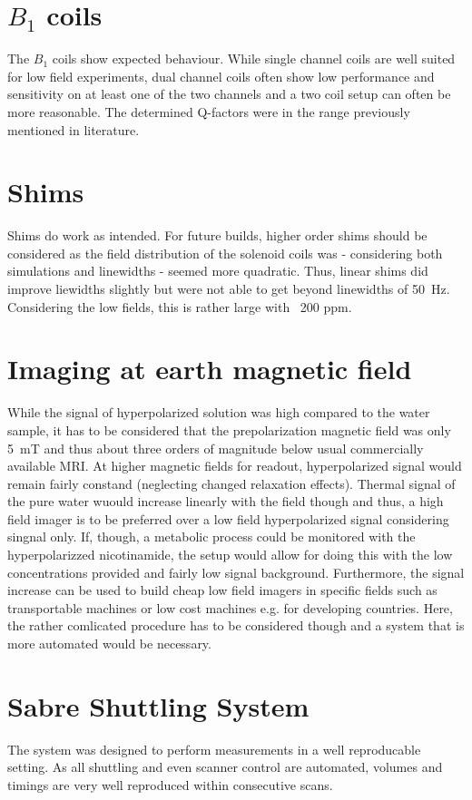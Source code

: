     \section{$B_1$ coils}
        The $B_1$ coils show expected behaviour. While single channel coils are well suited for low field experiments, dual channel coils often show low performance and sensitivity on at least one of the two channels and a two coil setup can often be more reasonable. The determined Q-factors were in the range previously mentioned in literature. 
    \section{Shims}
        Shims do work as intended. For future builds, higher order shims should be considered as the field distribution of the solenoid coils was - considering both simulations and linewidths - seemed more quadratic. Thus, linear shims did improve liewidths slightly but were not able to get beyond linewidths of \SI{50}{\hertz}. Considering the low fields, this is rather large with ~200 ppm.
    \section{Imaging at earth magnetic field}
        While the signal of hyperpolarized solution was high compared to the water sample, it has to be considered that the prepolarization magnetic field was only \SI{5}{\milli\tesla} and thus about three orders of magnitude below usual commercially available MRI. At higher magnetic fields for readout, hyperpolarized signal would remain fairly constand (neglecting changed relaxation effects). Thermal signal of the pure water wuould increase linearly with the field though and thus, a high field imager is to be preferred over a low field hyperpolarized signal considering singnal only. If, though, a metabolic process could be monitored with the hyperpolarizzed nicotinamide, the setup would allow for doing this with the low concentrations provided and fairly low signal background. Furthermore, the signal increase can be used to build cheap low field imagers in specific fields such as transportable machines or low cost machines e.g. for developing countries. Here, the rather comlicated procedure has to be considered though and a system that is more automated would be necessary.
    \section{Sabre Shuttling System}
        The system was designed to perform measurements in a well reproducable setting. As all shuttling and even scanner control are automated, volumes and timings are very well reproduced within consecutive scans.
